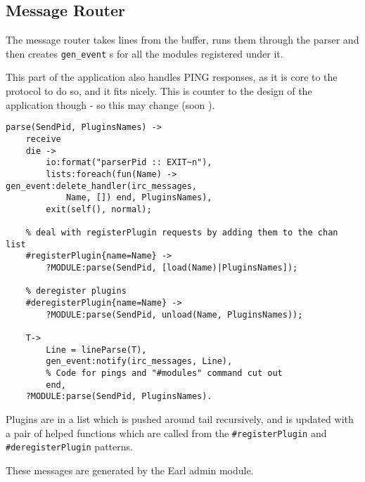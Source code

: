 \documentclass[12pt]{article}
\begin{document}
\subsection*{Message Router}

The message router takes lines from the buffer, runs them through the parser 
and then creates \texttt{gen\_event} s for all the modules registered under it.

This part of the application also handles PING responses, as it is core to the
protocol to do so, and it fits nicely. This is counter to the design of the 
application though - so this may change (soon \texttrademark).

\begin{lstlisting}
parse(SendPid, PluginsNames) ->
    receive
	die ->
	    io:format("parserPid :: EXIT~n"),
	    lists:foreach(fun(Name) -> gen_event:delete_handler(irc_messages, 
	    	Name, []) end, PluginsNames),
	    exit(self(), normal);

    % deal with registerPlugin requests by adding them to the chan list
	#registerPlugin{name=Name} ->
	    ?MODULE:parse(SendPid, [load(Name)|PluginsNames]);

	% deregister plugins
	#deregisterPlugin{name=Name} ->
	    ?MODULE:parse(SendPid, unload(Name, PluginsNames));

	T->
	    Line = lineParse(T),
	    gen_event:notify(irc_messages, Line),
	    % Code for pings and "#modules" command cut out
	    end,
    ?MODULE:parse(SendPid, PluginsNames).
\end{lstlisting}

Plugins are in a list which is pushed around tail recursively, and is updated
with a pair of helped functions which are called from the
\texttt{#registerPlugin} and \texttt{#deregisterPlugin} patterns.

These messages are generated by the Earl admin module.
\end{document}
